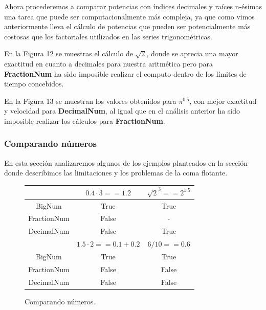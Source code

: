 \documentclass[a4paper,10pt,twocolumn]{article}
\begin{document}
	Ahora procederemos a comparar potencias con índices decimales y raíces n-ésimas una tarea que puede ser computacionalmente más compleja, ya que como vimos anteriormente lleva el cálculo de potencias que pueden ser potencialmente más costosas que los factoriales utilizados en las series trigonométricas.
	
	En la Figura 12 se muestras el cálculo de $\sqrt{2}$, donde se aprecia una mayor exactitud en cuanto a decimales para nuestra aritmética pero para \textbf{FractionNum} ha sido imposible realizar el computo dentro de los límites de tiempo concebidos.
	
	En la Figura 13 se muestran los valores obtenidos para $\pi^{0.5}$, con mejor exactitud y velocidad para \textbf{DecimalNum}, al igual que en el análisis anterior ha sido imposible realizar los cálculos para \textbf{FractionNum}.
	
\subsubsection{Comparando números}\label{sub:number_comp}

	En esta sección analizaremos algunos de los ejemplos planteados en la sección donde describimos las limitaciones y los problemas de la coma flotante.
	
	\begin{figure}[h!]%
		\begin{center}
			\begin{tabular}{|c|c|c|} \hline
			 			 & $0.4\cdot 3==1.2$ 	    & $\sqrt{2}^3==2^{1.5}$ 	\\ \hline
			BigNum       &  True  & True     \\ \hline
			FractionNum  &  False &   -   \\ \hline
			DecimalNum   &  False & True   \\ \hline
						& $1.5\cdot 2==0.1+0.2$ 	    & $6/10==0.6$	\\ \hline
			BigNum       &  True  & True     \\ \hline
			FractionNum  &  False & False  \\ \hline
			DecimalNum   &  False & False  \\ \hline

\end{tabular}
		\caption{Comparando números. \label{fig:ex}}
		\end{center}
	\end{figure}
	
\end{document}
